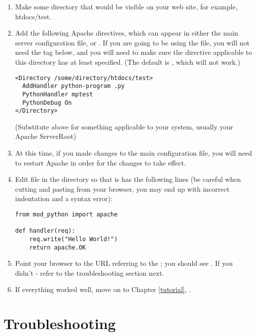 \begin{enumerate}

\item
Make some directory that would be visible on your web site, for
example, htdocs/test.

\item
Add the following Apache directives, which can appear in either the
main server configuration file, or .  If you are going
to be using the  file, you will not need the
 tag below, and you will need to make sure the
 directive applicable to this directory has at least
 specified. (The default is , which will not work.)

\begin{verbatim}
<Directory /some/directory/htdocs/test> 
  AddHandler python-program .py
  PythonHandler mptest 
  PythonDebug On 
</Directory>
\end{verbatim}

(Substitute  above for something applicable to
your system, usually your Apache ServerRoot)

\item
At this time, if you made changes to the main configuration file, you
will need to restart Apache in order for the changes to take effect.

\item
Edit  file in the  directory so
that is has the following lines (be careful when cutting and pasting
from your browser, you may end up with incorrect indentation and a
syntax error):

\begin{verbatim}
from mod_python import apache

def handler(req):
    req.write("Hello World!")
    return apache.OK 
\end{verbatim}

\item
Point your browser to the URL referring to the ; you
should see . If you didn't - refer to the
troubleshooting section next.

\item
If everything worked well, move on to Chapter \ref{tutorial}, 
. 

\end{enumerate}

\section{Troubleshooting\label{inst-trouble}}

